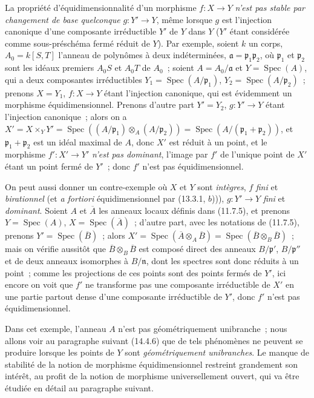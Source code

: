\begin{remark}[13.3.9]
La propriété d'équidimensionnalité d'un morphisme $f:X\to Y$ \emph{n'est pas
stable par changement de base quelconque} $g:Y'\to Y$, même lorsque $g$ est
l'injection canonique d'une composante irréductible $Y'$ de $Y$ dans $Y$
($Y'$ étant
considérée comme sous-préschéma fermé réduit de $Y$). Par exemple, soient $k$
un corps, $A_0=k[S,T]$ l'anneau de polynômes à deux indéterminées,
$\mathfrak a=\mathfrak p_1\mathfrak p_2$, où $\mathfrak p_1$ et
$\mathfrak p_2$ sont les idéaux premiers $A_0S$ et $A_0T$ de $A_0$~; soient
$A=A_0/\mathfrak a$ et $Y=\operatorname{Spec}(A)$, qui a deux composantes
irréductibles $Y_1=\operatorname{Spec}(A/\mathfrak p_1)$,
$Y_2=\operatorname{Spec}(A/\mathfrak p_2)$~; prenons $X=Y_1$,
$f:X\to Y$ étant l'injection canonique, qui est évidemment un morphisme
équidimensionnel. Prenons d'autre part $Y'=Y_2$, $g:Y'\to Y$ étant l'injection
canonique~; alors on a
$X'=X\times_Y Y'=\operatorname{Spec}((A/\mathfrak p_1)\otimes_A
(A/\mathfrak p_2))=\operatorname{Spec}(A/(\mathfrak p_1+\mathfrak p_2))$,
et $\mathfrak p_1+\mathfrak p_2$ est un idéal maximal de $A$, donc $X'$ est
réduit à un point, et le morphisme $f':X'\to Y'$ \emph{n'est pas dominant},
l'image par $f'$ de l'unique point de $X'$ étant un point fermé de $Y'$~;
donc $f'$ n'est pas équidimensionnel.

On peut aussi donner un contre-exemple où $X$ et $Y$ sont \emph{intègres}, $f$
\emph{fini} et \emph{birationnel} (et \emph{a fortiori} équidimensionnel par
(13.3.1, $b$))), $g:Y'\to Y$ \emph{fini} et \emph{dominant}. Soient $A$ et
$\overline A$ les anneaux locaux définis dans (11.7.5), et prenons
$Y=\operatorname{Spec}(A)$, $X=\operatorname{Spec}(\overline A)$~; d'autre
part, avec les notations de (11.7.5), prenons
$Y'=\operatorname{Spec}(\overline B)$~; alors
$X'=\operatorname{Spec}(\overline A\otimes_A\overline B)
=\operatorname{Spec}(\overline B\otimes_B\overline B)$~; mais on vérifie
aussitôt que $\overline B\otimes_B\overline B$ est composé direct des anneaux
$B/\mathfrak p'$, $B/\mathfrak p''$ et de deux anneaux isomorphes à
$B/\mathfrak n$, dont les spectres sont donc réduits à un point~; comme les
projections de ces points sont des points fermés de $Y'$, ici encore on voit
que $f'$ ne transforme pas une composante irréductible de $X'$ en une partie
partout dense d'une composante irréductible de $Y'$, donc $f'$ n'est pas
équidimensionnel.

Dans cet exemple, l'anneau $A$ n'est pas géométriquement unibranche~; nous
allons voir au paragraphe suivant (14.4.6) que de tels phénomènes ne peuvent se
produire lorsque les points de $Y$ sont \emph{géométriquement unibranches}. Le
manque de stabilité de la notion de morphisme équidimensionnel restreint
grandement son intérêt, au profit de la notion de morphisme universellement
ouvert, qui va être étudiée en détail au paragraphe suivant.
\end{remark}

